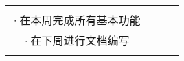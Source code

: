 \documentclass{article}
\begin{document}
\begin{center}
\begin{longtable}{c|c|cc}
{{        ·在本周末对接完所有前后端                                                                                                                          \\
        ·在本周完成所有基本功能                                                                                                                            \\
        ·在下周进行文档编写                                                                                                                                \\
        }}                                                                                                                                                 \\
        \hline
    \end{longtable}%
\end{center}

\end{document}
